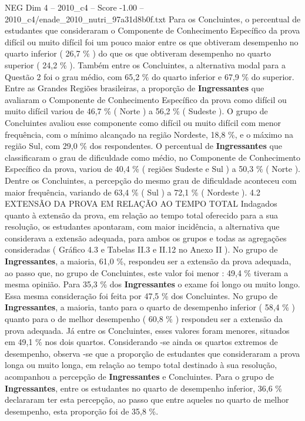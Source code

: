 \begin{textsample}{NEG Dim 4 – 2010\_c4 – Score -1.00 – 2010\_c4/enade\_2010\_nutri\_97a31d8b0f.txt}
Para os Concluintes, o percentual de estudantes que consideraram o Componente de Conhecimento Específico da prova difícil ou muito difícil foi um pouco maior entre os que obtiveram desempenho no quarto inferior ( 26,7 \% ) do que os que obtiveram desempenho no quarto superior ( 24,2 \% ).
Também entre os Concluintes, a alternativa modal para a Questão 2 foi o grau médio, com 65,2 \% do quarto inferior e 67,9 \% do superior.
Entre as Grandes Regiões brasileiras, a proporção de \textbf{Ingressantes} que avaliaram o Componente de Conhecimento Específico da prova como difícil ou muito difícil variou de 46,7 \% ( Norte ) a 56,2 \% ( Sudeste ).
O grupo de Concluintes avaliou esse componente como difícil ou muito difícil com menor frequência, com o mínimo alcançado na região Nordeste, 18,8 \%, e o máximo na região Sul, com 29,0 \% dos respondentes.
O percentual de \textbf{Ingressantes} que classificaram o grau de dificuldade como médio, no Componente de Conhecimento Específico da prova, variou de 40,4 \% ( regiões Sudeste e Sul ) a 50,3 \% ( Norte ).
Dentre os Concluintes, a percepção do mesmo grau de dificuldade aconteceu com maior frequência, variando de 63,4 \% ( Sul ) a 72,1 \% ( Nordeste ). 4.2 EXTENSÃO DA PROVA EM RELAÇÃO AO TEMPO TOTAL Indagados quanto à extensão da prova, em relação ao tempo total oferecido para a sua resolução, os estudantes apontaram, com maior incidência, a alternativa que considerava a extensão adequada, para ambos os grupos e todas as agregações consideradas ( Gráfico 4.3 e Tabelas II.3 e II.12 no Anexo II ).
No grupo de \textbf{Ingressantes}, a maioria, 61,0 \%, respondeu ser a extensão da prova adequada, ao passo que, no grupo de Concluintes, este valor foi menor : 49,4 \% tiveram a mesma opinião.
Para 35,3 \% dos \textbf{Ingressantes} o exame foi longo ou muito longo.
Essa mesma consideração foi feita por 47,5 \% dos Concluintes.
No grupo de \textbf{Ingressantes}, a maioria, tanto para o quarto de desempenho inferior ( 58,4 \% ) quanto para o de melhor desempenho ( 60,8 \% ) respondeu ser a extensão da prova adequada.
Já entre os Concluintes, esses valores foram menores, situados em 49,1 \% nos dois quartos.
Considerando -se ainda os quartos extremos de desempenho, observa -se que a proporção de estudantes que consideraram a prova longa ou muito longa, em relação ao tempo total destinado à sua resolução, acompanhou a percepção de \textbf{Ingressantes} e Concluintes.
Para o grupo de \textbf{Ingressantes}, entre os estudantes no quarto de desempenho inferior, 36,6 \% declararam ter esta percepção, ao passo que entre aqueles no quarto de melhor desempenho, esta proporção foi de 35,8 \%.

\end{textsample}
